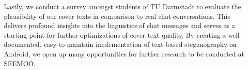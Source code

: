 Lastly, we conduct a survey amongst students of TU Darmstadt to evaluate the plausibility of our cover texts in comparison to real chat conversations. This delivers profound insights into the linguistics of chat messages and serves as a starting point for further optimizations of cover text quality. By creating a well-documented, easy-to-maintain implementation of text-based steganography on Android, we open up many opportunities for further research to be conducted at SEEMOO.
